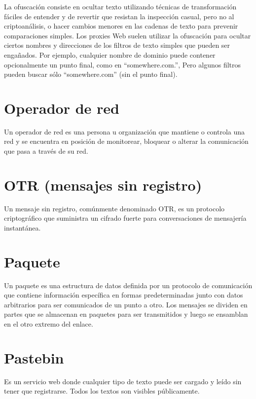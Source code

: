 \documentclass[10pt,a5paper,twoside,,]{book}
\begin{document}
La ofuscación consiste en ocultar texto utilizando técnicas de
transformación fáciles de entender y de revertir que resistan la
inspección casual, pero no al criptoanálisis, o hacer cambios menores en
las cadenas de texto para prevenir comparaciones simples. Los proxies
Web suelen utilizar la ofuscación para ocultar ciertos nombres y
direcciones de los filtros de texto simples que pueden ser engañados.
Por ejemplo, cualquier nombre de dominio puede contener opcionalmente un
punto final, como en ``somewhere.com.'', Pero algunos filtros pueden
buscar sólo ``somewhere.com'' (sin el punto final).

\section{Operador de red}\label{operador-de-red}

Un operador de red es una persona u organización que mantiene o controla
una red y se encuentra en posición de monitorear, bloquear o alterar la
comunicación que pasa a través de su red.

\section{OTR (mensajes sin registro)}\label{otr-mensajes-sin-registro}

Un mensaje sin registro, comúnmente denominado OTR, es un protocolo
criptográfico que suministra un cifrado fuerte para conversaciones de
mensajería instantánea.

\section{Paquete}\label{paquete}

Un paquete es una estructura de datos definida por un protocolo de
comunicación que contiene información específica en formas
predeterminadas junto con datos arbitrarios para ser comunicados de un
punto a otro. Los mensajes se dividen en partes que se almacenan en
paquetes para ser transmitidos y luego se ensamblan en el otro extremo
del enlace.

\section{Pastebin}\label{pastebin}

Es un servicio web donde cualquier tipo de texto puede ser cargado y
leído sin tener que registrarse. Todos los textos son visibles
públicamente.
\end{document}
